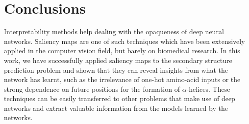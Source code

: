 \documentclass{article}
\begin{document}



\section{Conclusions}
\label{sec:conclusions}

Interpretability methods help dealing with the opaqueness of deep neural networks.
Saliency maps are one of such techniques which have been extensively applied in the computer vision field, but barely on biomedical research.
In this work, we have successfully applied saliency maps to the secondary structure prediction problem and shown that they can reveal insights from what the network has learnt, such as the irrelevance of one-hot amino-acid inputs or the strong dependence on future positions for the formation of $\alpha$-helices.
These techniques can be easily transferred to other problems that make use of deep networks and extract valuable information from the models learned by the networks.

\end{document}
